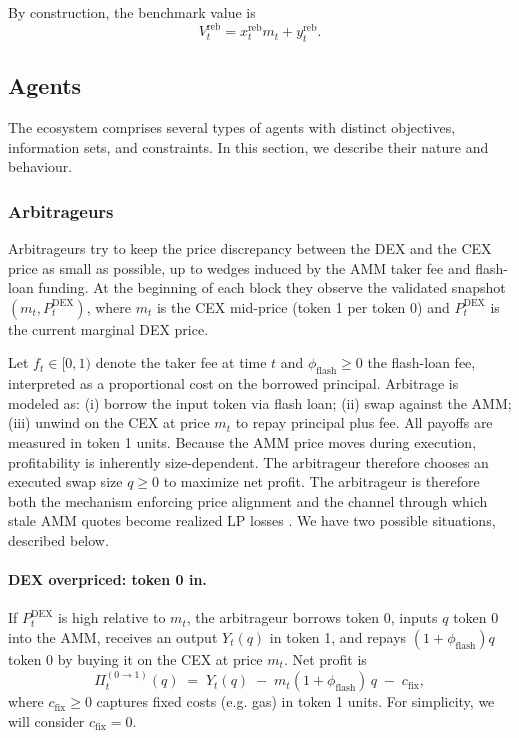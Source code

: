 \documentclass[11pt]{article}
\begin{document}
By construction, the benchmark value is
\begin{equation}
  V_t^{\mathrm{reb}} = x_t^{\mathrm{reb}} m_t + y_t^{\mathrm{reb}}.
\end{equation}

\subsection{Agents}
\label{sec:agents}

The ecosystem comprises several types of agents with distinct objectives, information sets, and constraints. In this section, we describe their nature and behaviour.

\subsubsection{Arbitrageurs}

Arbitrageurs try to keep the price discrepancy between the DEX and the CEX price as small as possible, up to wedges induced by the AMM taker fee and flash-loan funding.
At the beginning of each block they observe the validated snapshot $(m_t, P_t^{\mathrm{DEX}})$,
where $m_t$ is the CEX mid-price (token 1 per token 0) and $P_t^{\mathrm{DEX}}$ is the current
marginal DEX price.

Let $f_t\in[0,1)$ denote the taker fee at time $t$ and $\phi_{\mathrm{flash}}\ge 0$ the flash-loan fee,
interpreted as a proportional cost on the borrowed principal. Arbitrage is modeled as:
(i) borrow the input token via flash loan; (ii) swap against the AMM; (iii) unwind on the CEX at price
$m_t$ to repay principal plus fee. All payoffs are measured in token 1 units.
Because the AMM price moves during execution, profitability is inherently size-dependent.
The arbitrageur therefore chooses an executed swap size $q\ge 0$ to maximize net profit. The arbitrageur is therefore both the mechanism enforcing price alignment and the channel through which stale AMM quotes become realized LP losses \cite{angeris2021analysis,milionis2023,fritsch2024,CARTEA2025105134}. We have two possible situations, described below.


\paragraph{DEX overpriced: token 0 in.}
If $P_t^{\mathrm{DEX}}$ is high relative to $m_t$, the arbitrageur borrows token 0, inputs
$q$ token 0 into the AMM, receives an output $Y_t(q)$ in token 1, and repays $(1+\phi_{\mathrm{flash}})q$
token 0 by buying it on the CEX at price $m_t$.
Net profit is
\begin{equation}
  \Pi_t^{(0\rightarrow 1)}(q)
  \;=\;
  Y_t(q) \;-\; m_t(1+\phi_{\mathrm{flash}})\,q \;-\; c_{\mathrm{fix}},
  \label{eq:arb-profit-0in}
\end{equation}
where $c_{\mathrm{fix}}\ge 0$ captures fixed costs (e.g. gas) in token 1 units. For simplicity, we will
consider $c_{\mathrm{fix}} = 0$. 
\end{document}
